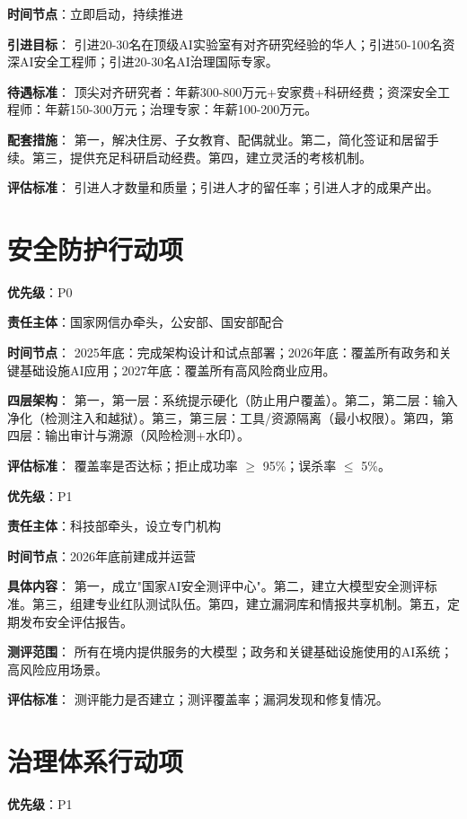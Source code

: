 \textbf{时间节点}：立即启动，持续推进

\textbf{引进目标}：
引进20-30名在顶级AI实验室有对齐研究经验的华人；引进50-100名资深AI安全工程师；引进20-30名AI治理国际专家。

\textbf{待遇标准}：
顶尖对齐研究者：年薪300-800万元+安家费+科研经费；资深安全工程师：年薪150-300万元；治理专家：年薪100-200万元。

\textbf{配套措施}：
第一，解决住房、子女教育、配偶就业。第二，简化签证和居留手续。第三，提供充足科研启动经费。第四，建立灵活的考核机制。

\textbf{评估标准}：
引进人才数量和质量；引进人才的留任率；引进人才的成果产出。

\section{安全防护行动项}

\textbf{优先级}：P0

\textbf{责任主体}：国家网信办牵头，公安部、国安部配合

\textbf{时间节点}：
2025年底：完成架构设计和试点部署；2026年底：覆盖所有政务和关键基础设施AI应用；2027年底：覆盖所有高风险商业应用。

\textbf{四层架构}：
第一，第一层：系统提示硬化（防止用户覆盖）。第二，第二层：输入净化（检测注入和越狱）。第三，第三层：工具/资源隔离（最小权限）。第四，第四层：输出审计与溯源（风险检测+水印）。

\textbf{评估标准}：
覆盖率是否达标；拒止成功率 $\geq$ 95\%；误杀率 $\leq$ 5\%。

\textbf{优先级}：P1

\textbf{责任主体}：科技部牵头，设立专门机构

\textbf{时间节点}：2026年底前建成并运营

\textbf{具体内容}：
第一，成立"国家AI安全测评中心"。第二，建立大模型安全测评标准。第三，组建专业红队测试队伍。第四，建立漏洞库和情报共享机制。第五，定期发布安全评估报告。

\textbf{测评范围}：
所有在境内提供服务的大模型；政务和关键基础设施使用的AI系统；高风险应用场景。

\textbf{评估标准}：
测评能力是否建立；测评覆盖率；漏洞发现和修复情况。

\section{治理体系行动项}

\textbf{优先级}：P1

